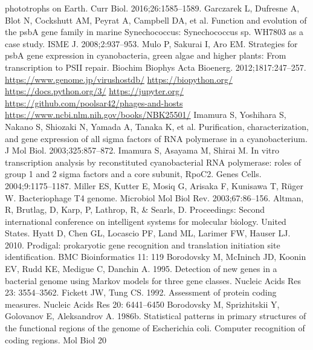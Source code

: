 \documentclass[14pt]{extarticle}
\begin{document}
\begin{thebibliography}{9}
    phototrophs on Earth. Curr Biol. 2016;26:1585–1589.
     Garczarek L, Dufresne A, Blot N, Cockshutt AM, Peyrat A, Campbell DA, et al. Function and evolution of
    the psbA gene family in marine Synechococcus: Synechococcus sp. WH7803 as a case study. ISME J. 2008;2:937–953.
     Mulo P, Sakurai I, Aro EM. Strategies for psbA gene expression in cyanobacteria, green algae and 
    higher plants: From transcription to PSII repair. Biochim Biophys Acta Bioenerg. 2012;1817:247–257.
     \url{https://www.genome.jp/virushostdb/}
     \url{https://biopython.org/}
     \url{https://docs.python.org/3/}
     \url{https://jupyter.org/}
     \url{https://github.com/poolsar42/phages-and-hosts}
     \url{https://www.ncbi.nlm.nih.gov/books/NBK25501/}
     Imamura S, Yoshihara S, Nakano S, Shiozaki N, Yamada A, Tanaka K, et al. Purification, 
    characterization, and gene expression of all sigma factors of RNA polymerase in a cyanobacterium. J Mol Biol. 
    2003;325:857–872.
     Imamura S, Asayama M, Shirai M. In vitro transcription analysis by reconstituted cyanobacterial RNA 
    polymerase: roles of group 1 and 2 sigma factors and a core subunit, RpoC2. Genes Cells. 2004;9:1175–1187.
     Miller ES, Kutter E, Mosiq G, Arisaka F, Kunisawa T, Rüger W. Bacteriophage T4 genome. Microbiol Mol 
    Biol Rev. 2003;67:86–156.
       Altman, R, Brutlag, D, Karp, P, Lathrop, R, \& Searls, D. Proceedings: Second international 
    conference on intelligent systems for molecular biology. United States. 
      Hyatt D, Chen GL, Locascio PF, Land ML, Larimer FW, Hauser LJ. 2010. Prodigal: prokaryotic gene 
    recognition and translation initiation site identification. BMC Bioinformatics 11: 119
      Borodovsky M, McIninch JD, Koonin EV, Rudd KE, Medigue C, Danchin A. 1995. Detection of new genes
    in a bacterial genome using Markov models for three gene classes. Nucleic Acids Res 23: 3554–3562.
     Fickett JW, Tung CS. 1992. Assessment of protein coding measures. Nucleic Acids Res 20: 6441–6450
     Borodovsky M, Sprizhitskii Y, Golovanov E, Aleksandrov A. 1986b. Statistical patterns in primary 
    structures of the functional regions of the genome of Escherichia coli. Computer recognition of coding regions. Mol 
    Biol 20
    
\end{thebibliography}
\end{document}
